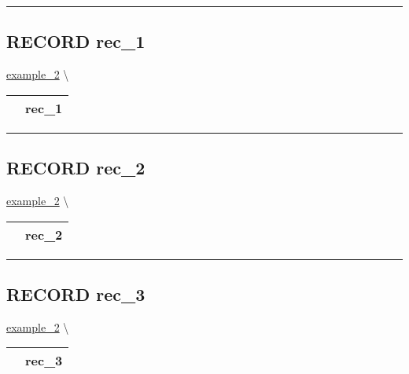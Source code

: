 \rule{\linewidth}{0.5pt}

\subsection*{\textsf{\colorbox{headtoc}{\color{white} RECORD}
rec\_1}}

\hypertarget{ecldoc:intest.example_2.rec_1}{}
\hspace{0pt} \hyperlink{ecldoc:intest.example_2}{example_2} \textbackslash 

{\renewcommand{\arraystretch}{1.5}
\begin{tabularx}{\textwidth}{|>{\raggedright\arraybackslash}l|X|}
\hline
\hspace{0pt}\mytexttt{\color{red} } & \textbf{rec\_1} \\
\hline
\end{tabularx}
}

\par


\rule{\linewidth}{0.5pt}
\subsection*{\textsf{\colorbox{headtoc}{\color{white} RECORD}
rec\_2}}

\hypertarget{ecldoc:intest.example_2.rec_2}{}
\hspace{0pt} \hyperlink{ecldoc:intest.example_2}{example_2} \textbackslash 

{\renewcommand{\arraystretch}{1.5}
\begin{tabularx}{\textwidth}{|>{\raggedright\arraybackslash}l|X|}
\hline
\hspace{0pt}\mytexttt{\color{red} } & \textbf{rec\_2} \\
\hline
\end{tabularx}
}

\par


\rule{\linewidth}{0.5pt}
\subsection*{\textsf{\colorbox{headtoc}{\color{white} RECORD}
rec\_3}}

\hypertarget{ecldoc:intest.example_2.rec_3}{}
\hspace{0pt} \hyperlink{ecldoc:intest.example_2}{example_2} \textbackslash 

{\renewcommand{\arraystretch}{1.5}
\begin{tabularx}{\textwidth}{|>{\raggedright\arraybackslash}l|X|}
\hline
\hspace{0pt}\mytexttt{\color{red} } & \textbf{rec\_3} \\
\hline
\end{tabularx}
}

